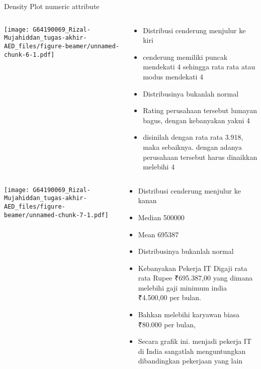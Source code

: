 \documentclass[
  ignorenonframetext,
]{beamer}
\providecommand{\tightlist}{%
  \setlength{\itemsep}{0pt}\setlength{\parskip}{0pt}}
\begin{document}
\begin{frame}{Density Plot numeric attribute}
\protect\hypertarget{density-plot-numeric-attribute}{}
\begin{columns}[T]
\begin{column}{0.48\textwidth}
\texttt{[image: G64190069\_Rizal-Mujahiddan\_tugas-akhir-AED\_files/figure-beamer/unnamed-chunk-6-1.pdf]}
\end{column}

\begin{column}{0.48\textwidth}
\begin{itemize}
\tightlist
\item
  Distribusi cenderung menjulur ke kiri
\item
  cenderung memiliki puncak mendekati 4 sehingga rata rata atau modus
  mendekati 4
\item
  Distribusinya bukanlah normal
\item
  Rating perusahaan tersebut lumayan bagus, dengan kebanyakan yakni 4
\item
  disinilah dengan rata rata 3.918, maka sebaiknya. dengan adanya
  perusahaan tersebut harus dinaikkan melebihi 4
\end{itemize}
\end{column}
\end{columns}

\begin{columns}[T]
\begin{column}{0.48\textwidth}
\texttt{[image: G64190069\_Rizal-Mujahiddan\_tugas-akhir-AED\_files/figure-beamer/unnamed-chunk-7-1.pdf]}
\end{column}

\begin{column}{0.48\textwidth}
\begin{itemize}
\tightlist
\item
  Distribusi cenderung menjulur ke kanan
\item
  Median 500000
\item
  Mean 695387
\item
  Distribusinya bukanlah normal
\item
  Kebanyakan Pekerja IT Digaji rata rata Rupee ₹695.387,00 yang dimana
  melebihi gaji minimum india ₹4.500,00 per bulan.
\item
  Bahkan melebihi karyawan biasa ₹80.000 per bulan,
\item
  Secara grafik ini. menjadi pekerja IT di India sangatlah menguntungkan
  dibandingkan pekerjaan yang lain
\end{itemize}
\end{column}
\end{columns}


\end{frame}
\end{document}
